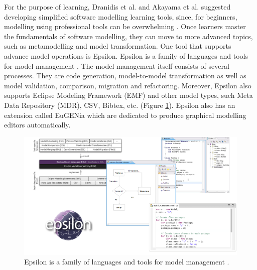 \documentclass[12pt, a4paper]{report}
\begin{document}
For the purpose of learning, Dranidis et al. and Akayama et al. suggested developing simplified software modelling learning tools, since, for beginners, modelling using professional tools can be overwhelming \cite{dranidis2015learning, Akayama2013}. Once learners master the fundamentals of software modelling, they can move to more advanced topics, such as metamodelling and model transformation. One tool that supports advance model operations is Epsilon. Epsilon is a family of languages and tools for model management \cite{kolovos2010epsilon}. The model management itself consists of several processes. They are code generation, model-to-model transformation as well as model validation, comparison, migration and refactoring. Moreover, Epsilon also supports Eclipse Modeling Framework (EMF) and other model types, such Meta Data Repository (MDR), CSV, Bibtex, etc. (Figure \ref{epsilon}). Epsilon also has an extension called EuGENia which are dedicated to produce graphical modelling editors automatically\cite{kolovos2015eugenia}.


\begin{figure}[ht]
\centering
\includegraphics[width=\textwidth]{epsilon}
\caption{Epsilon is a family of languages and tools for model management \cite{kolovos2010epsilon}.}
\label{epsilon}
\end{figure}
\end{document}
